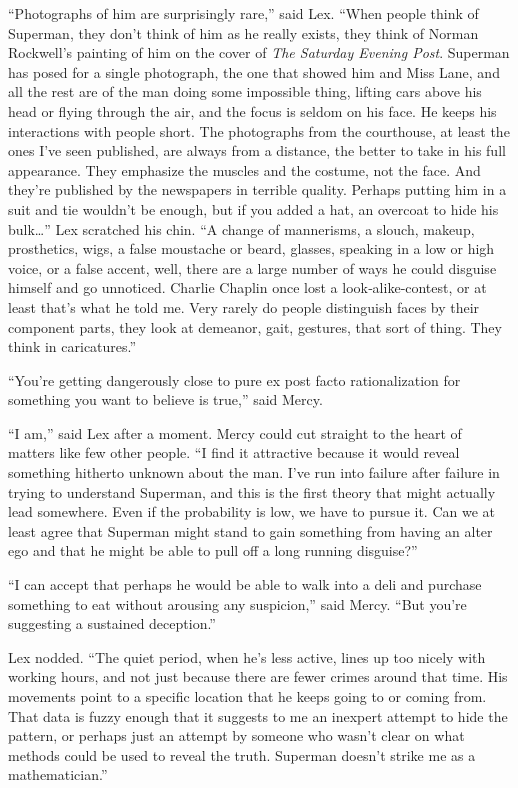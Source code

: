``Photographs of him are surprisingly rare,'' said Lex. ``When people
think of Superman, they don't think of him as he really exists, they
think of Norman Rockwell's painting of him on the cover of \emph{The
Saturday Evening Post}. Superman has posed for a single photograph, the
one that showed him and Miss Lane, and all the rest are of the man doing
some impossible thing, lifting cars above his head or flying through the
air, and the focus is seldom on his face. He keeps his interactions with
people short. The photographs from the courthouse, at least the ones
I've seen published, are always from a distance, the better to take in
his full appearance. They emphasize the muscles and the costume, not the
face. And they're published by the newspapers in terrible quality.
Perhaps putting him in a suit and tie wouldn't be enough, but if you
added a hat, an overcoat to hide his bulk\ldots'' Lex scratched his
chin. ``A change of mannerisms, a slouch, makeup, prosthetics, wigs, a
false moustache or beard, glasses, speaking in a low or high voice, or a
false accent, well, there are a large number of ways he could disguise
himself and go unnoticed. Charlie Chaplin once lost a
look‐alike‐contest, or at least that's what he told me. Very rarely do
people distinguish faces by their component parts, they look at
demeanor, gait, gestures, that sort of thing. They think in
caricatures.''

``You're getting dangerously close to pure ex post facto rationalization
for something you want to believe is true,'' said Mercy.

``I am,'' said Lex after a moment. Mercy could cut straight to the heart
of matters like few other people. ``I find it attractive because it
would reveal something hitherto unknown about the man. I've run into
failure after failure in trying to understand Superman, and this is the
first theory that might actually lead somewhere. Even if the probability
is low, we have to pursue it. Can we at least agree that Superman might
stand to gain something from having an alter ego and that he might be
able to pull off a long running disguise?''

``I can accept that perhaps he would be able to walk into a deli and
purchase something to eat without arousing any suspicion,'' said Mercy.
``But you're suggesting a sustained deception.''

Lex nodded. ``The quiet period, when he's less active, lines up too
nicely with working hours, and not just because there are fewer crimes
around that time. His movements point to a specific location that he
keeps going to or coming from. That data is fuzzy enough that it
suggests to me an inexpert attempt to hide the pattern, or perhaps just
an attempt by someone who wasn't clear on what methods could be used to
reveal the truth. Superman doesn't strike me as a mathematician.''


